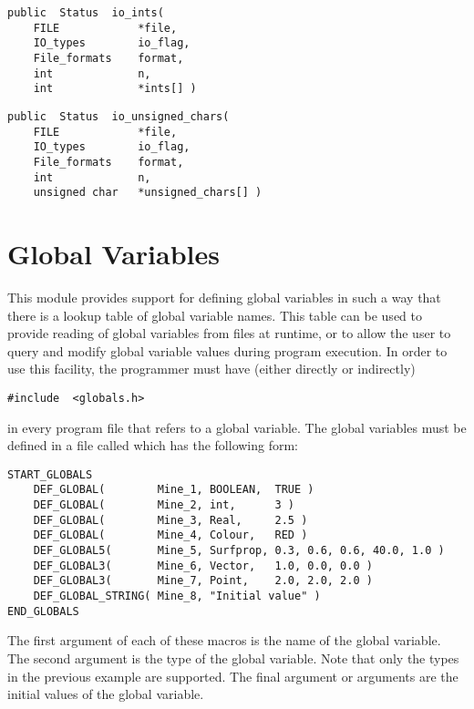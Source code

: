 
{\bf\begin{verbatim}
public  Status  io_ints(
    FILE            *file,
    IO_types        io_flag,
    File_formats    format,
    int             n,
    int             *ints[] )
\end{verbatim}}


{\bf\begin{verbatim}
public  Status  io_unsigned_chars(
    FILE            *file,
    IO_types        io_flag,
    File_formats    format,
    int             n,
    unsigned char   *unsigned_chars[] )
\end{verbatim}}


\section{Global Variables}

This module provides support for defining global variables in such a
way that there is a lookup table of global variable names.  This table
can be used to provide reading of global variables from files at
runtime, or to allow the user to query and modify global variable
values during program execution.  In order to use this facility, the
programmer must have (either directly or indirectly)
{\bf\begin{verbatim}
#include  <globals.h>
\end{verbatim}}
in every program file that refers to a global variable.  The
global variables must be defined in a file called
 which has the following form:
{\bf\begin{verbatim}
START_GLOBALS
    DEF_GLOBAL(        Mine_1, BOOLEAN,  TRUE )
    DEF_GLOBAL(        Mine_2, int,      3 )
    DEF_GLOBAL(        Mine_3, Real,     2.5 )
    DEF_GLOBAL(        Mine_4, Colour,   RED )
    DEF_GLOBAL5(       Mine_5, Surfprop, 0.3, 0.6, 0.6, 40.0, 1.0 )
    DEF_GLOBAL3(       Mine_6, Vector,   1.0, 0.0, 0.0 )
    DEF_GLOBAL3(       Mine_7, Point,    2.0, 2.0, 2.0 )
    DEF_GLOBAL_STRING( Mine_8, "Initial value" )
END_GLOBALS
\end{verbatim}}
The first argument of each of these macros is the name of the global
variable.  The second argument is the type of the global variable.
Note that only the types in the previous example are supported.  The
final argument or arguments are the initial values of the global
variable.

